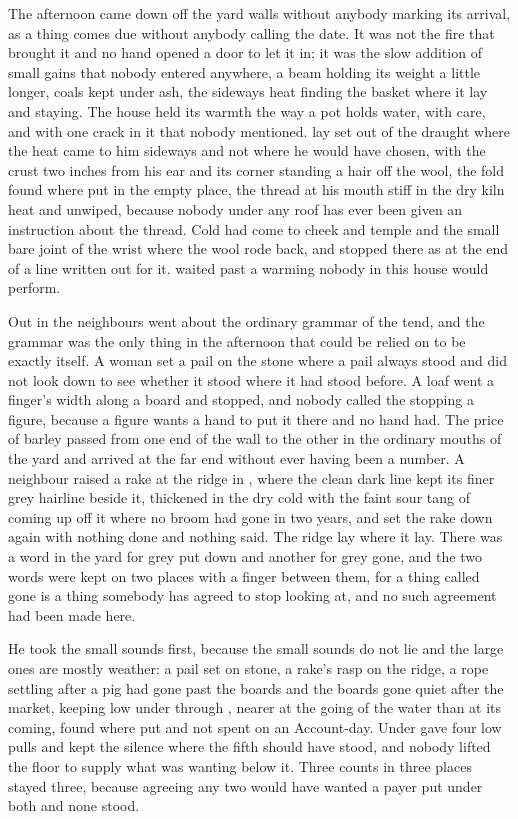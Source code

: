 The afternoon came down off the yard walls without anybody marking its arrival, as a thing comes due without anybody calling the date. It was not the fire that brought it and no hand opened a door to let it in; it was the slow addition of small gains that nobody entered anywhere, a beam holding its weight a little longer, coals kept under ash, the sideways heat finding the basket where it lay and staying. The house held its warmth the way a pot holds water, with care, and with one crack in it that nobody mentioned.  lay set out of the draught where the heat came to him sideways and not where he would have chosen, with the crust two inches from his ear and its corner standing a hair off the wool, the fold found where put in the empty place, the thread at his mouth stiff in the dry kiln heat and unwiped, because nobody under any roof has ever been given an instruction about the thread. Cold had come to cheek and temple and the small bare joint of the wrist where the wool rode back, and stopped there as at the end of a line written out for it.  waited past a warming nobody in this house would perform.

Out in  the neighbours went about the ordinary grammar of the tend, and the grammar was the only thing in the afternoon that could be relied on to be exactly itself. A woman set a pail on the stone where a pail always stood and did not look down to see whether it stood where it had stood before. A loaf went a finger's width along a board and stopped, and nobody called the stopping a figure, because a figure wants a hand to put it there and no hand had. The price of barley passed from one end of the wall to the other in the ordinary mouths of the yard and arrived at the far end without ever having been a number. A neighbour raised a rake at the ridge in , where the clean dark line kept its finer grey hairline beside it, thickened in the dry cold with the faint sour tang of  coming up off it where no broom had gone in two years, and set the rake down again with nothing done and nothing said. The ridge lay where it lay. There was a word in the yard for grey put down and another for grey gone, and the two words were kept on two places with a finger between them, for a thing called gone is a thing somebody has agreed to stop looking at, and no such agreement had been made here.

He took the small sounds first, because the small sounds do not lie and the large ones are mostly weather: a pail set on stone, a rake's rasp on the ridge, a rope settling after a pig had gone past the boards and the boards gone quiet after the market,  keeping  low under  through , nearer at the going of the water than at its coming, found where put and not spent on an Account-day. Under   gave four low pulls and kept the silence where the fifth should have stood, and nobody lifted the floor to supply what was wanting below it. Three counts in three places stayed three, because agreeing any two would have wanted a payer put under both and none stood.

